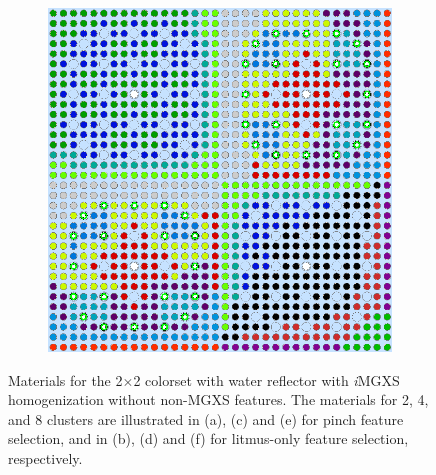 \begin{appendices}
\begin{figure}[h!]
\begin{subfigure}{0.48\textwidth}
  \caption{}
  \label{fig:no-features-reflector-pinch-8}
\end{subfigure}%
\begin{subfigure}{0.48\textwidth}
  \centering
  \includegraphics[width=0.85\linewidth]{figures/unsupervised/geometries/without-features/8-clusters/combined/reflector}
  \caption{}
  \label{fig:no-features-reflector-combined-8}
\end{subfigure}
\caption[Clustered geometries without non-MGXS features]{Materials for the 2$\times$2 colorset with water reflector with \textit{i}\ac{MGXS} homogenization without non-\ac{MGXS} features. The materials for 2, 4, and 8 clusters are illustrated in (a), (c) and (e) for pinch feature selection, and in (b), (d) and (f) for litmus-only feature selection, respectively.}
\label{fig:no-features-reflector-geometries}
\end{figure}

\clearpage


\end{appendices}
